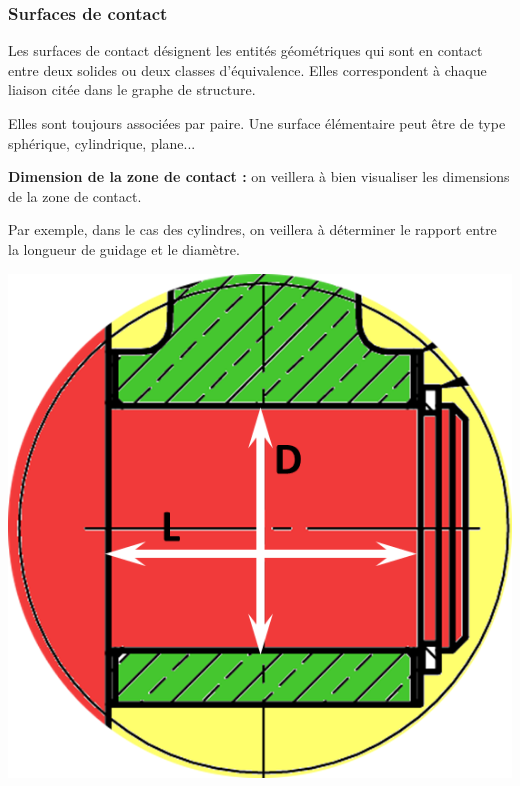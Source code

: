 \documentclass[10pt,oneside]{article}
\begin{document}
\subsubsection{Surfaces de contact}

\begin{defi}
Les surfaces de contact désignent les entités géométriques qui sont en contact entre deux solides ou deux classes d'équivalence. Elles correspondent à chaque liaison citée dans le graphe de structure.

Elles sont toujours associées par paire. Une surface élémentaire peut être de type sphérique, cylindrique, plane...
\end{defi}

\begin{rem}
\begin{minipage}[c]{.7\linewidth}
\textbf{Dimension de la zone de contact :} on veillera à bien visualiser les dimensions de la zone de contact. 

Par exemple, dans le cas des cylindres, on veillera à déterminer le rapport entre la longueur de guidage et le diamètre.
\end{minipage}
\hfill
\begin{minipage}[c]{.25\linewidth}
\begin{center}
\includegraphics[width=.9\textwidth]{png/rapportLD}
\end{center}
\end{minipage}
\end{rem}
\end{document}
